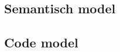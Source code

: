 \subsection{Semantisch model}
\label{subsection:arch-semantic-model}

\TODO \citep{fowler2010domain}

\subsection{Code model}
\label{subsection:arch-code-model}

\TODO

